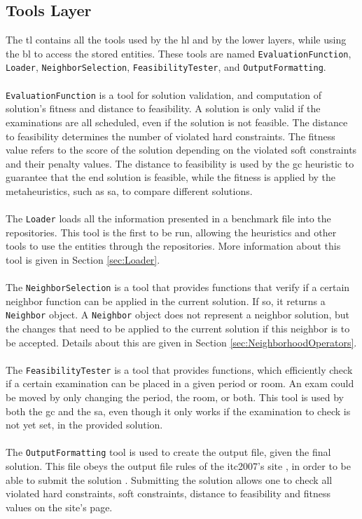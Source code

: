 \subsection{Tools Layer}
\label{subsec:ToolsLayer}
The \gls{tl} contains all the tools used by the \gls{hl} and by the lower layers, while using the \gls{bl} to access the stored entities. These tools are named \verb+EvaluationFunction+, \verb+Loader+, \verb+NeighborSelection+, \verb+FeasibilityTester+, and \verb+OutputFormatting+.\\
\\
\verb+EvaluationFunction+ is a tool  for solution validation, and computation of solution's fitness and distance to feasibility. A solution is only valid if the examinations are all scheduled, even if the solution is not feasible. The distance to feasibility determines the number of violated hard constraints. The fitness value refers to the score of the solution depending on the violated soft constraints and their penalty values. The distance to feasibility is used by the \gls{gc} heuristic to guarantee that the end solution is feasible, while the fitness is applied by the metaheuristics, such as \gls{sa}, to compare different solutions.\\
\\
The \verb+Loader+ loads all the information presented in a benchmark file into the repositories. This tool is the first to be run, allowing the heuristics and other tools to use the entities through the repositories. More information about this tool is given in Section \ref{sec:Loader}.\\
\\
The \verb+NeighborSelection+ is a tool that provides functions that verify if a certain neighbor function can be applied in the current solution. If so, it returns a \verb+Neighbor+ object. A \verb+Neighbor+ object does not represent a neighbor solution, but the changes that need to be applied to the current solution if this neighbor is to be accepted. Details about this are given in Section \ref{sec:NeighborhoodOperators}.\\
\\
The \verb+FeasibilityTester+ is a tool that provides functions, which efficiently check if a certain examination can be placed in a given period or room. An exam could be moved by only changing the period, the room, or both. This tool is used by both the \gls{gc} and the \gls{sa}, even though it only works if the examination to check is not yet set, in the provided solution.\\
\\
The \verb+OutputFormatting+ tool is used to create the output file, given the final solution. This file obeys the output file rules of the \gls{itc2007}'s site \cite{McCollum2007b}, in order to be able to submit the solution \cite{McCollum2007c}. Submitting the solution allows one to check all violated hard constraints, soft constraints, distance to feasibility and fitness values on the site's page.

